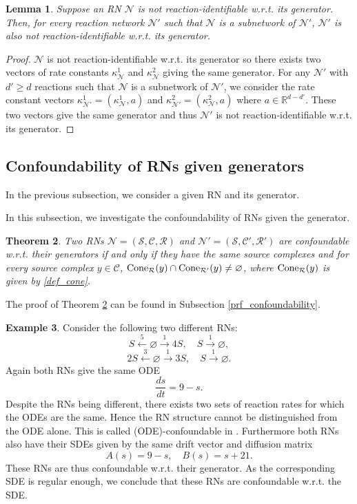 \documentclass[10pt,a4paper]{amsart}
\let\emptyset\varnothing
\newtheorem{theorem}{Theorem}[section]
\newtheorem{lemma}[theorem]{Lemma}
\theoremstyle{definition}
\newtheorem{example}[theorem]{Example}
\theoremstyle{remark}
\theoremstyle{consequence}
\def\k{\kappa}
\def\cN{\mathcal{N}}
\def\cR{\mathcal{R}}
\def\cS{\mathcal{S}}
\def\cC{\mathcal{C}}
\def\R{\mathbb{R}}
\numberwithin{equation}{section}
\begin{document}
\begin{lemma}\label{cor_subnetwork}
  Suppose an RN $\mathcal{N}$ is not reaction-identifiable w.r.t. its generator. Then, for every reaction network $\mathcal{N}'$ such that $\mathcal{N}$ is a subnetwork of $\cN'$, $\cN'$ is also not reaction-identifiable w.r.t. its generator. 
\end{lemma}
{\begin{proof}
    $\mathcal{N}$ is not reaction-identifiable w.r.t. its generator so there exists two vectors of rate constants $\kappa^1_{\mathcal{N}}$ and $\k^2_{\mathcal{N}}$ giving the same generator.  For any $\mathcal{N}'$ with $d' \geq d$ reactions such that $\cN$ is a subnetwork of $\cN'$, we consider the rate constant vectors $\kappa^1_{\cN'} = (\kappa^1_{\cN},a)$ and $\kappa^2_{\mathcal{N}'}=(\kappa^2_{\mathcal{N}},a)$ where $a \in \R^{d-d'}$. These two vectors give the same generator and thus $\cN'$ is not reaction-identifiable w.r.t. its generator. 
\end{proof}}




\subsection{{Confoundability} of RNs given generators}
In the previous subsection, we consider a given RN and its generator.

In this subsection, we investigate the confoundability of RNs given the generator.

 





\begin{theorem}\label{confoundability}
Two RNs $\cN = (\cS, \cC, \cR)$ and $\cN' = (\cS, \cC', \cR')$ are confoundable w.r.t. their generators if and only if they have the same source complexes and for every source complex $y\in\cC$, ${\rm Cone}_\cR(y) \cap {\rm Cone}_{\cR'}(y) \neq \emptyset$, where ${\rm Cone}_\cR(y) $ is given by \eqref{def_cone}.
\end{theorem}
The proof of Theorem \ref{confoundability} can be found in Subsection \ref{prf_confoundability}.


\begin{example}\label{example_cofoundability} 
Consider the following two different RNs:
$$S\xleftarrow{5}\emptyset\xrightarrow{1}4S,  \quad S\xrightarrow{1}\emptyset , $$
$$2S\xleftarrow{3}\emptyset\xrightarrow{1}3S, \quad S\xrightarrow{1}\emptyset .$$
Again both RNs give the same ODE
$$\frac{ds}{dt}=9-s.$$
Despite the RNs being different, there exists two sets of reaction rates for which the ODEs are the same. Hence the RN structure cannot be distinguished from the ODE alone. This is called (ODE)-confoundable in \cite{craciun2}. Furthermore both RNs also have their SDEs given by the same drift vector and diffusion matrix
$$A(s)=9-s,\quad B(s)=s+21.$$
These RNs are thus confoundable w.r.t. their generator. 
As the corresponding SDE is regular enough, 
 we conclude that these RNs are confoundable w.r.t. the SDE. 
\end{example}
\end{document}
